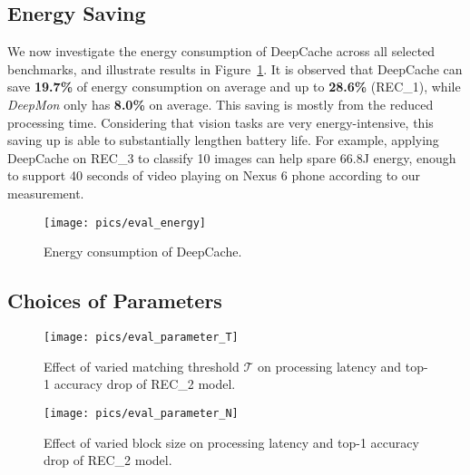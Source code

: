 \documentclass[10pt,acmtog]{acmart}
\newcommand{\framework}{DeepCache\xspace}
\begin{document}
\subsection{Energy Saving}

We now investigate the energy consumption of \framework across all selected benchmarks, and illustrate results in Figure~\ref{fig:eval_energy}.
It is observed that \framework can save \textbf{19.7\%} of energy consumption on average and up to \textbf{28.6\%} (REC\_1), while \emph{DeepMon} only has \textbf{8.0\%} on average.
This saving is mostly from the reduced processing time.
Considering that vision tasks are very energy-intensive, this saving up is able to substantially lengthen battery life.
For example, applying \framework on REC\_3 to classify 10 images can help spare 66.8J energy, enough to support 40 seconds of video playing on Nexus 6 phone according to our measurement.

\begin{figure}[t]
	\centering
	\texttt{[image: pics/eval\_energy]}
	\caption{Energy consumption of \framework.}
	\label{fig:eval_energy}
\end{figure}\subsection{Choices of Parameters}\label{sec:eval_choosing}\begin{figure}[t]
\centering
\scriptsize
\texttt{[image: pics/eval\_parameter\_T]}
\caption{Effect of varied matching threshold $\mathcal{T}$ on processing latency and top-1 accuracy drop of REC\_2 model.}
\label{fig:eval_parameter_T}
\end{figure}\begin{figure}[t]
\centering
\scriptsize
\texttt{[image: pics/eval\_parameter\_N]}
\caption{Effect of varied block size on processing latency and top-1 accuracy drop of REC\_2 model.}
\label{fig:eval_parameter_N}
\end{figure}
\end{document}
